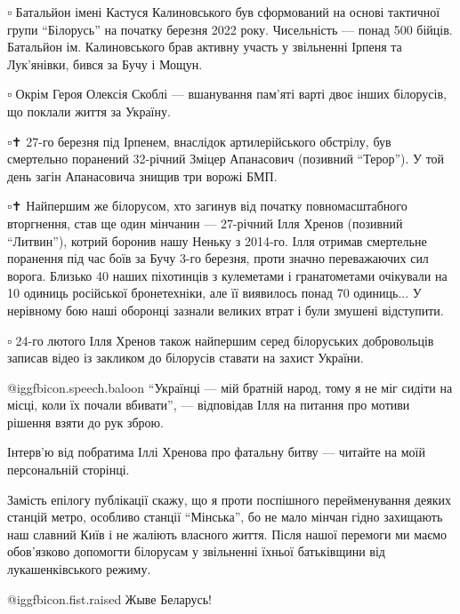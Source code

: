 ▫️ Батальйон імені Кастуся Калиновського був сформований на основі тактичної
групи \enquote{Білорусь} на початку березня 2022 року. Чисельність — понад 500 бійців.
Батальйон ім. Калиновського брав активну участь у звільненні Ірпеня та
Лук'янівки, бився за Бучу і Мощун.

▫️ Окрім Героя Олексія Скоблі — вшанування пам'яті варті двоє інших білорусів,
що поклали життя за Україну.

▫️✝️ 27-го березня під Ірпенем, внаслідок артилерійського обстрілу, був
смертельно поранений 32-річний Зміцер Апанасович (позивний \enquote{Терор}). У той день
загін Апанасовича знищив три ворожі БМП.

▫️✝️ Найпершим же білорусом, хто загинув від початку повномасштабного вторгнення,
став ще один мінчанин — 27-річний Ілля Хренов (позивний \enquote{Литвин}), котрий
боронив нашу Неньку з 2014-го. Ілля отримав смертельне поранення під час боїв
за Бучу 3-го березня, проти значно переважаючих сил ворога. Близько 40 наших
піхотинців з кулеметами і гранатометами очікували на 10 одиниць російської
бронетехніки, але її виявилось понад 70 одиниць... У нерівному бою наші
оборонці зазнали великих втрат і були змушені відступити.

▫️ 24-го лютого Ілля Хренов також найпершим серед білоруських добровольців
записав відео із закликом до білорусів ставати на захист України.

 @igg{fbicon.speech.baloon}  \enquote{Українці — мій братній народ, тому я не міг сидіти на місці, коли їх почали
вбивати}, — відповідав Ілля на питання про мотиви рішення взяти до рук зброю.

Інтерв'ю від побратима Іллі Хренова про фатальну битву — читайте на моїй
персональній сторінці.

Замість епілогу публікації скажу, що я проти поспішного перейменування деяких
станцій метро, особливо станції \enquote{Мінська}, бо не мало мінчан гідно захищають
наш славний Київ і не жаліють власного життя. Після нашої перемоги ми маємо
обов'язково допомогти білорусам у звільненні їхньої батьківщини від
лукашенківського режиму.

@igg{fbicon.fist.raised}  Жыве Беларусь!

